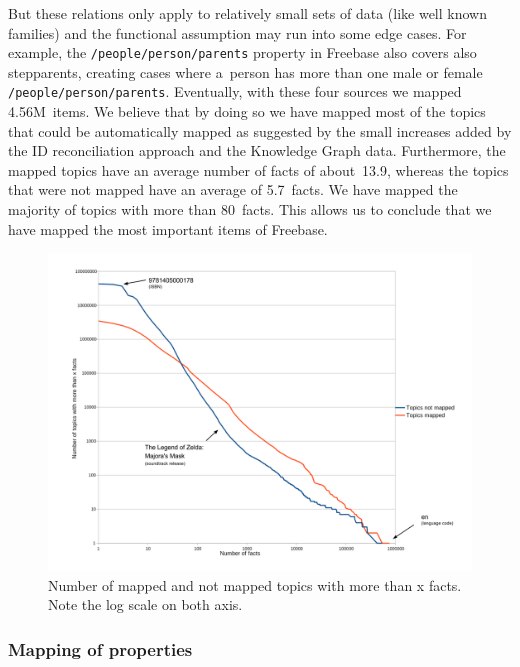 \documentclass{sig-alternate}
\begin{document}
But these relations only apply to relatively small sets of data (like well known families)
and the functional assumption may run into some edge cases.
For example, the \texttt{/people/person/parents} property in Freebase also covers also stepparents,
creating cases where a~person has more than one male or female \texttt{/people/person/parents}.
Eventually, with these four sources we mapped 4.56M~items.
We believe that by doing so we have mapped most of the topics that could be automatically mapped
as suggested by the small increases added by the ID reconciliation approach
and the Knowledge Graph data.
Furthermore, the mapped topics have an average number of facts of about~13.9,
whereas the topics that were not mapped have an average of 5.7~facts.
We have mapped the majority of topics with more than 80~facts.
This allows us to conclude that we have mapped the most important items of Freebase.

\begin{figure}
\centering
\includegraphics[width=8.45 cm]{img/facts-topics-mapping.png}
\caption{Number of mapped and not mapped topics with more than x facts.
Note the log scale on both axis.}
\end{figure}

\subsubsection{Mapping of properties}
\end{document}
